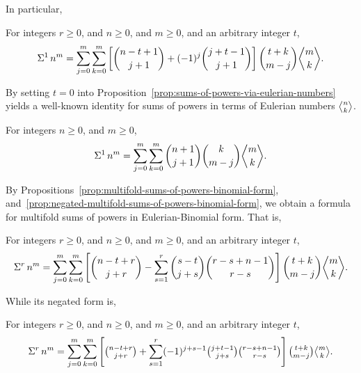 In particular,

\begin{proposition}
  \label{prop:sums-of-powers-via-eulerian-numbers}
  For integers $r\geq0$, and $n\geq 0$, and $m\geq 0$,
  and an arbitrary integer $t$,
  \begin{align*}
    \KnuthRFoldSum{1}{n}{m}
    = \sum_{j=0}^{m} \sum_{k=0}^{m}
    \left[ \binom{n-t+1}{j+1} + (-1)^j \binom{j+t-1}{j+1} \right]
    \binom{t+k}{m-j} \eulerian{m}{k}.
  \end{align*}
\end{proposition}

By setting $t=0$ into
Proposition~\eqref{prop:sums-of-powers-via-eulerian-numbers}
yields a well-known identity for
sums of powers in terms of Eulerian numbers $\eulerian{n}{k}$.
\begin{corollary}
  For integers $n\geq 0$, and $m\geq 0$,
  \begin{align*}
    \KnuthRFoldSum{1}{n}{m}=
    \sum_{j=0}^{m} \sum_{k=0}^{m}
    \binom{n+1}{j+1} \binom{k}{m-j} \eulerian{m}{k}.
  \end{align*}
\end{corollary}

By Propositions~\eqref{prop:multifold-sums-of-powers-binomial-form},
and~\eqref{prop:negated-multifold-sums-of-powers-binomial-form},
we obtain a formula for multifold sums of powers in Eulerian-Binomial form.
That is,

\begin{proposition}
  For integers $r\geq0$, and $n\geq 0$, and $m\geq 0$,
  and an arbitrary integer $t$,
  \begin{align*}
    \KnuthRFoldSum{r}{n}{m}
    = \sum_{j=0}^{m} \sum_{k=0}^{m}
    \left[ \binom{n-t+r}{j+r} -
      \sum_{s=1}^{r} \binom{s-t}{j+s} \binom{r-s+n-1}{r-s}
    \right]
    \binom{t+k}{m-j} \eulerian{m}{k}.
  \end{align*}
\end{proposition}
While its negated form is,
\begin{proposition}
  For integers $r\geq0$, and $n\geq 0$, and $m\geq 0$,
  and an arbitrary integer $t$,
  \begin{align*}
    \KnuthRFoldSum{r}{n}{m}
    = \sum_{j=0}^{m} \sum_{k=0}^{m}
    \left[ \tbinom{n-t+r}{j+r} +
      \sum_{s=1}^{r} (-1)^{j+s-1} \tbinom{j+t-1}{j+s} \tbinom{r-s+n-1}{r-s}
    \right]
    \tbinom{t+k}{m-j} \teulerian{m}{k}.
  \end{align*}
\end{proposition}

